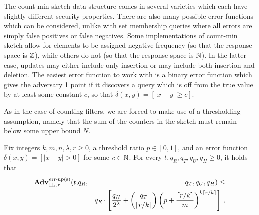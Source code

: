 

The count-min sketch data structure comes in several varieties which each have
slightly different security properties. There are also many possible error
functions which can be considered, unlike with set membership queries where all
errors are simply false positives or false negatives. Some implementations of
count-min sketch allow for elements to be assigned negative frequency (so that
the response space is $\mathbb{Z}$), while others do not (so that the response space is
$\mathbb{N}$). In the latter case, updates may either include only insertion or may
include both insertion and deletion. The easiest error function to work with is
a binary error function which gives the adversary 1 point if it discovers a
query which is off from the true value by at least some constant $c$, so that
$\delta(x,y) = [|x - y| \ge c]$.

As in the case of counting filters, we are forced to make use of a thresholding
assumption, namely that the sum of the counters in the sketch must remain below
some upper bound $N$.

\begin{theorem}\label{thm:count-ms-bound}
Fix integers $k, m, n, \lambda, r\geq 0$, a threshold ratio $p \in [0,1]$, and
an error function $\delta(x,y) = [|x - y| > 0]$ for some $c \in \mathbb{N}$.
  For every $t, q_R, q_T, q_U, q_H \geq 0$, it holds that
  \begin{eqnarray*}
    \Adv{\erreps}_{\struct_s,r}(t,&q_R,& q_T, q_U, q_H) \leq \\ && q_R \cdot \left[\frac{q_H}{2^\lambda} + \binom{q_T}{\lceil r/k \rceil}\left(p+\frac{\lceil r/k \rceil}{m}\right)^{k\lceil r/k \rceil}\right] \,,
\end{eqnarray*}
\end{theorem}

